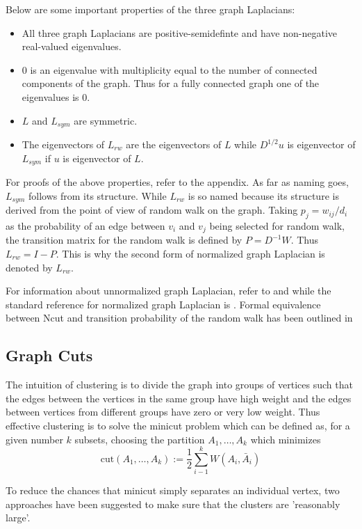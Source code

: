 \documentclass[10pt,a4paper, nocenter]{report}
\begin{document}
		Below are some important properties of the three graph Laplacians:
		\begin{itemize}
			\item All three graph Laplacians are positive-semidefinte and have non-negative real-valued eigenvalues.
			\item 0 is an eigenvalue with multiplicity equal to the number of connected components of the graph. Thus for a fully connected graph one of the eigenvalues is 0. \item $L$ and $L_{sym}$ are symmetric. 
			\item The eigenvectors of $L_{rw}$ are the eigenvectors of $L$ while $D^{1/2}u$ is eigenvector of $L_{sym}$ if $u$ is eigenvector of $L$. 
        
    	\end{itemize}
    For proofs of the above properties, refer to the appendix. As far as naming goes, $L_{sym}$ follows from its structure. While $L_{rw}$ is so named because its structure is derived from the point of view of random walk on the graph. Taking $p_j = w_{ij}/d_i$ as the probability of an edge between $v_i$ and $v_j$ being selected for random walk, the transition matrix for the random walk is defined by $P = D^{-1}W$. Thus $L_{rw} = I-P$. This is why the second form of normalized graph Laplacian is denoted by $L_{rw}$.
    
    For information about unnormalized graph Laplacian, refer to \cite{mohar-1991} and \cite{mohar-1997} while the standard reference for normalized graph Laplacian is \cite{graph-spectral-book}. Formal equivalence between Ncut and transition probability of the random walk has been outlined in \cite{Meila01arandom}

    \subsection{Graph Cuts}
        The intuition of clustering is to divide the graph into groups of vertices such that the edges between the vertices in the same group have high weight and the edges between vertices from different groups have zero or very low weight. Thus effective clustering is to solve the minicut problem which can be defined as, for a given number $k$ subsets, choosing the partition $A_{1}, \dots, A_{k}$ which minimizes $$ \text{cut}(A_{1}, \dots, A_{k}) := \frac{1}{2}\sum_{i-1}^{k}W(A_i,\bar{A}_{i}) $$

        To reduce the chances that minicut simply separates an individual vertex, two approaches have been suggested to make sure that the clusters are 'reasonably large'. 
\end{document}
